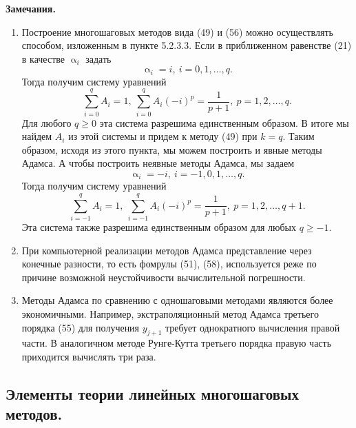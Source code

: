 \documentclass[a4paper, 12pt]{report}
\numberwithin{equation}{section}
\renewcommand{\geq}{\geqslant}
\renewcommand{\alpha}{\upalpha}
\begin{document}
	 \textbf{Замечания.}
	 \begin{enumerate}
	 	\item Построение многошаговых методов вида (49) и (56) можно осуществлять способом, изложенным в пункте 5.2.3.3. Если в приближенном равенстве (21) в качестве $\alpha_i$ задать $$\alpha_i =i,\ i = 0,1,\ldots, q.$$ Тогда получим систему уравнений $$\sum_{i=0}^{q}A_i = 1,\ \sum_{i=0}^{q}A_i(-i)^p = \dfrac{1}{p+1},\ p = 1,2,\ldots, q.$$
	 	Для любого $q \geq 0$ эта система разрешима единственным образом. В итоге мы найдем $A_i$ из этой системы и придем к методу (49) при $k=q$. Таким образом, исходя из этого пункта, мы можем построить и явные методы Адамса. А чтобы построить неявные методы Адамса, мы задаем $$\alpha_i = -i,\ i = -1, 0, 1,\ldots, q.$$
	 	Тогда получим систему уравнений $$\sum_{i=-1}^{q}A_i = 1,\ \sum_{i=-1}^{q}A_i(-i)^p = \dfrac{1}{p+1},\ p = 1,2,\ldots, q+1.$$
	 	Эта система также разрешима единственным образом для любых $q \geq -1$.
	 	\item При компьютерной реализации методов Адамса представление через конечные разности, то есть фомрулы (51), (58), используется реже по причине возможной неустойчивости вычислительной погрешности.
	 	\item Методы Адамса по сравнению с одношаговыми методами являются более экономичными. Например, экстраполяционный метод Адамса третьего порядка (55) для получения $y_{j+1}$ требует однократного вычисления правой части. В аналогичном методе Рунге-Кутта третьего порядка правую часть приходится вычислять три раза.
	 \end{enumerate}
	 \subsection{Элементы теории линейных многошаговых методов.}
\end{document}
